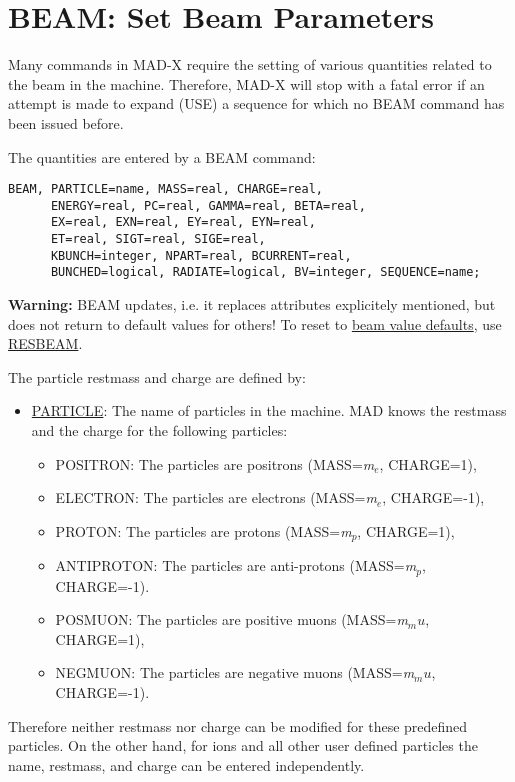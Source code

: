 %
\section{BEAM: Set Beam Parameters}
\label{sec:beam}
Many commands in MAD-X require the setting of various quantities related
to the beam in the machine. Therefore, MAD-X will stop with a fatal
error if an attempt is made to expand (USE) a sequence for which no BEAM
command has been issued before.  

The quantities are entered by a BEAM command: 
\begin{verbatim}
BEAM, PARTICLE=name, MASS=real, CHARGE=real,
      ENERGY=real, PC=real, GAMMA=real, BETA=real,
      EX=real, EXN=real, EY=real, EYN=real,
      ET=real, SIGT=real, SIGE=real,
      KBUNCH=integer, NPART=real, BCURRENT=real,
      BUNCHED=logical, RADIATE=logical, BV=integer, SEQUENCE=name;
\end{verbatim} 

{\bf Warning:} BEAM updates, i.e. it replaces attributes explicitely
mentioned, but does not return to default values for others! To reset to
\href{resbeam.html#defaults}{beam value defaults},  use
\href{resbeam.html}{RESBEAM}.

The particle restmass and charge \label{beam_charge} are defined by:
\begin{itemize}
   \item \href{particle}{PARTICLE}: The name of particles in the
     machine. MAD knows the restmass and the charge for the
     following particles:  
     \begin{itemize}
	  \item POSITRON: The particles are positrons (MASS=\textit{m$_e$}, CHARGE=1), 
	  \item ELECTRON: The particles are electrons (MASS=\textit{m$_e$}, CHARGE=-1), 
	  \item PROTON: The particles are protons (MASS=\textit{m$_p$}, CHARGE=1), 
	  \item ANTIPROTON: The particles are anti-protons (MASS=\textit{m$_p$}, CHARGE=-1). 
	  \item POSMUON: The particles are positive muons (MASS=\textit{m$_mu$}, CHARGE=1), 
	  \item NEGMUON: The particles are negative muons (MASS=\textit{m$_mu$}, CHARGE=-1). 
     \end{itemize}
\end{itemize} 

Therefore neither restmass nor charge can be modified for these
predefined particles. On the other hand, for ions and all other user
defined particles the name, restmass, and charge can be entered
independently.  

